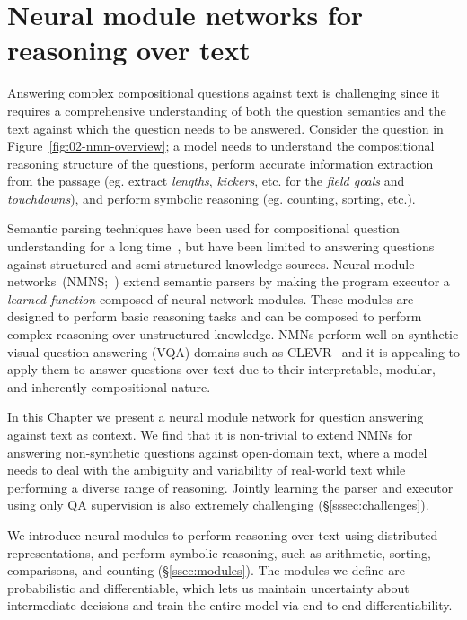 \documentclass[main.tex]{subfiles}
\begin{document}
\section{Neural module networks for reasoning over text} %
\label{sec:nmn-drop}

Answering complex compositional questions against text is challenging since it requires a comprehensive understanding of both the question semantics and the text against which the question needs to be answered.
Consider the question in Figure~\ref{fig:02-nmn-overview}; a model needs to understand the compositional reasoning structure of the questions, perform accurate information extraction from the passage (eg. extract \textit{lengths}, \textit{kickers}, etc. for the \textit{field goals} and \textit{touchdowns}), and perform symbolic reasoning (eg. counting, sorting, etc.).

Semantic parsing techniques have been used for compositional question understanding for a long time~\cite{zelle-1996,zettlemoyer-pccg-2005,liang-dcs-2011}, but have been limited to answering questions against structured and semi-structured knowledge sources.
Neural module networks~(NMNS;~) extend semantic parsers by making the program executor a \emph{learned function} composed of neural network modules.
These modules are designed to perform basic reasoning tasks and can be composed to perform complex reasoning over unstructured knowledge.
NMNs perform well on synthetic visual question answering (VQA) domains such as CLEVR~\cite{clevr-2017} and it is appealing to apply them to answer questions over text due to their interpretable, modular, and inherently compositional nature.


In this Chapter we present a neural module network for question answering against text as context.
We find that it is non-trivial to extend NMNs for answering non-synthetic questions against open-domain text, where a model needs to deal with the ambiguity and variability of real-world text while performing a diverse range of reasoning.  Jointly learning the parser and executor using only QA supervision is also extremely challenging (\S\ref{sssec:challenges}).

We introduce neural modules to perform reasoning over text using distributed representations, and perform symbolic reasoning, such as arithmetic, sorting, comparisons, and counting (\S\ref{ssec:modules}).
The modules we define are probabilistic and differentiable, which lets us maintain uncertainty about intermediate decisions and train the entire model via end-to-end differentiability.
\end{document}
